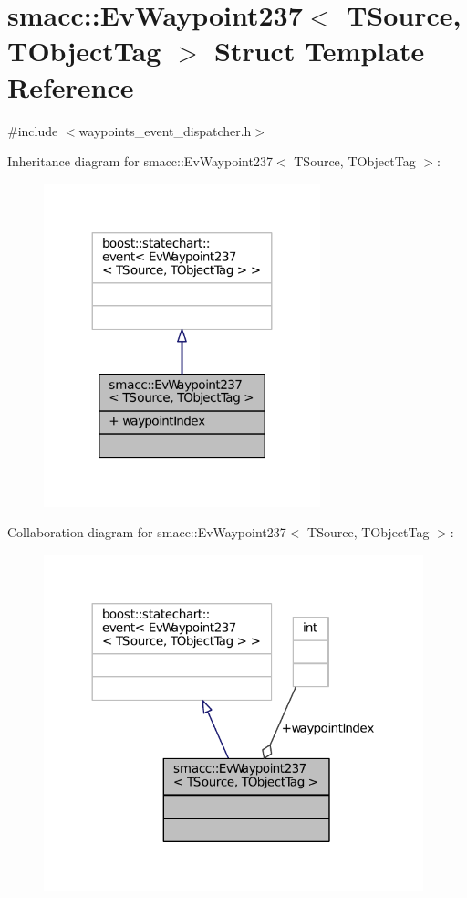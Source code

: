 \hypertarget{structsmacc_1_1EvWaypoint237}{}\section{smacc\+:\+:Ev\+Waypoint237$<$ T\+Source, T\+Object\+Tag $>$ Struct Template Reference}
\label{structsmacc_1_1EvWaypoint237}


{\ttfamily \#include $<$waypoints\+\_\+event\+\_\+dispatcher.\+h$>$}



Inheritance diagram for smacc\+:\+:Ev\+Waypoint237$<$ T\+Source, T\+Object\+Tag $>$\+:
\nopagebreak
\begin{figure}[H]
\begin{center}
\leavevmode
\includegraphics[width=227pt]{structsmacc_1_1EvWaypoint237__inherit__graph}
\end{center}
\end{figure}


Collaboration diagram for smacc\+:\+:Ev\+Waypoint237$<$ T\+Source, T\+Object\+Tag $>$\+:
\nopagebreak
\begin{figure}[H]
\begin{center}
\leavevmode
\includegraphics[width=312pt]{structsmacc_1_1EvWaypoint237__coll__graph}
\end{center}
\end{figure}
